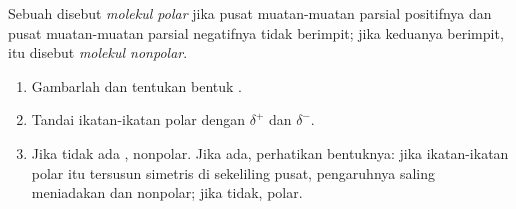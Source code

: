 \begin{definition}\label{def:g11:polarity-and-cohesion:polar-molecule}
Sebuah  disebut \emph{molekul polar} jika
pusat muatan-muatan parsial positifnya dan pusat muatan-muatan parsial
negatifnya tidak berimpit; jika keduanya berimpit,  itu disebut
\emph{molekul nonpolar}.
\end{definition}

\begin{method}\label{met:g11:polarity-and-cohesion:polar}
\begin{enumerate}
  \item Gambarlah  dan tentukan bentuk .
  \item Tandai ikatan-ikatan polar dengan $\delta^+$ dan $\delta^-$.
  \item Jika tidak ada ,  nonpolar. Jika ada,
        perhatikan bentuknya: jika ikatan-ikatan polar itu tersusun
        simetris di sekeliling pusat, pengaruhnya saling meniadakan dan
         nonpolar; jika tidak,  polar.
\end{enumerate}
\end{method}

